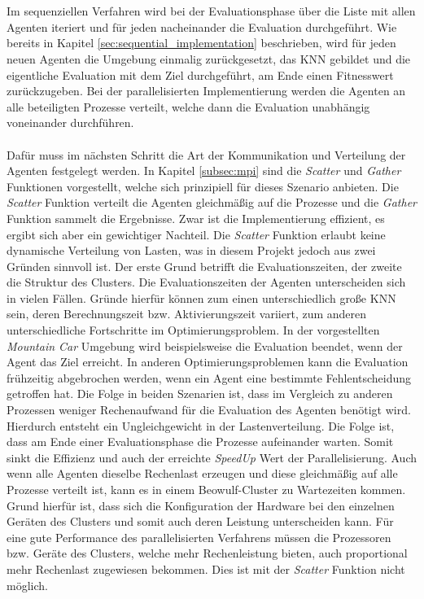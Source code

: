 \\\\
Im sequenziellen Verfahren wird bei der Evaluationsphase über die Liste mit allen Agenten iteriert und für jeden nacheinander die Evaluation durchgeführt. Wie bereits in Kapitel \ref{sec:sequential_implementation} beschrieben, wird für jeden neuen Agenten die Umgebung einmalig zurückgesetzt, das \ac{KNN} gebildet und die eigentliche Evaluation mit dem Ziel durchgeführt, am Ende einen Fitnesswert zurückzugeben. Bei der parallelisierten Implementierung werden die Agenten an alle beteiligten Prozesse verteilt, welche dann die Evaluation unabhängig voneinander durchführen. 
\\\\
Dafür muss im nächsten Schritt die Art der Kommunikation und Verteilung der Agenten festgelegt werden. In Kapitel \ref{subsec:mpi} sind die \emph{Scatter} und \emph{Gather} Funktionen vorgestellt, welche sich prinzipiell für dieses Szenario anbieten. Die \emph{Scatter} Funktion verteilt die Agenten gleichmäßig auf die Prozesse und die \emph{Gather} Funktion sammelt die Ergebnisse. Zwar ist die Implementierung effizient, es ergibt sich aber ein gewichtiger Nachteil. Die \emph{Scatter} Funktion erlaubt keine dynamische Verteilung von Lasten, was in diesem Projekt jedoch aus zwei Gründen sinnvoll ist. Der erste Grund betrifft die Evaluationszeiten, der zweite die Struktur des Clusters. Die Evaluationszeiten der Agenten unterscheiden sich in vielen Fällen. Gründe hierfür können zum einen unterschiedlich große \ac{KNN} sein, deren Berechnungszeit bzw. Aktivierungszeit variiert, zum anderen unterschiedliche Fortschritte im Optimierungsproblem. In der vorgestellten \emph{Mountain Car} Umgebung wird beispielsweise die Evaluation beendet, wenn der Agent das Ziel erreicht. In anderen Optimierungsproblemen kann die Evaluation frühzeitig abgebrochen werden, wenn ein Agent eine bestimmte Fehlentscheidung getroffen hat. Die Folge in beiden Szenarien ist, dass im Vergleich zu anderen Prozessen weniger Rechenaufwand für die Evaluation des Agenten benötigt wird. Hierdurch entsteht ein Ungleichgewicht in der Lastenverteilung. Die Folge ist, dass am Ende einer Evaluationsphase die Prozesse aufeinander warten. Somit sinkt die Effizienz und auch der erreichte \emph{SpeedUp} Wert der Parallelisierung. Auch wenn alle Agenten dieselbe Rechenlast erzeugen und diese gleichmäßig auf alle Prozesse verteilt ist, kann es in einem Beowulf-Cluster zu Wartezeiten kommen. Grund hierfür ist, dass sich die Konfiguration der Hardware bei den einzelnen Geräten des Clusters und somit auch deren Leistung unterscheiden kann. Für eine gute Performance des parallelisierten Verfahrens müssen die Prozessoren bzw. Geräte des Clusters, welche mehr Rechenleistung bieten, auch proportional mehr Rechenlast zugewiesen bekommen. Dies ist mit der \emph{Scatter} Funktion nicht möglich.
